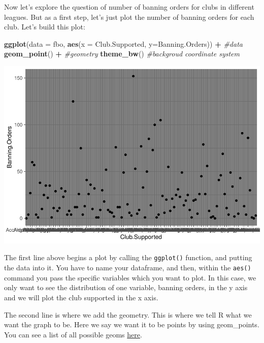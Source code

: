 \documentclass[]{book}
\newenvironment{Shaded}{\begin{snugshade}}{\end{snugshade}}
\newcommand{\CommentTok}[1]{\textcolor[rgb]{0.56,0.35,0.01}{\textit{#1}}}
\newcommand{\DataTypeTok}[1]{\textcolor[rgb]{0.13,0.29,0.53}{#1}}
\newcommand{\KeywordTok}[1]{\textcolor[rgb]{0.13,0.29,0.53}{\textbf{#1}}}
\newcommand{\NormalTok}[1]{#1}
\newcommand{\OperatorTok}[1]{\textcolor[rgb]{0.81,0.36,0.00}{\textbf{#1}}}
\newcommand{\StringTok}[1]{\textcolor[rgb]{0.31,0.60,0.02}{#1}}
\theoremstyle{definition}
\theoremstyle{definition}
\theoremstyle{definition}
\theoremstyle{remark}
\begin{document}
Now let's explore the question of number of banning orders for clubs in
different leagues. But as a first step, let's just plot the number of
banning orders for each club. Let's build this plot:

\begin{Shaded}
\begin{Highlighting}[]
\KeywordTok{ggplot}\NormalTok{(}\DataTypeTok{data =}\NormalTok{ fbo, }\KeywordTok{aes}\NormalTok{(}\DataTypeTok{x =}\NormalTok{ Club.Supported, }\DataTypeTok{y=}\NormalTok{Banning.Orders)) }\OperatorTok{+}\StringTok{          }\CommentTok{#data}
\StringTok{   }\KeywordTok{geom_point}\NormalTok{() }\OperatorTok{+}\StringTok{                           }\CommentTok{#geometry}
\StringTok{  }\KeywordTok{theme_bw}\NormalTok{()                                    }\CommentTok{#backgroud coordinate system}
\end{Highlighting}
\end{Shaded}

\includegraphics{03-visualisation_files/figure-latex/unnamed-chunk-4-1.pdf}

The first line above begins a plot by calling the \texttt{ggplot()}
function, and putting the data into it. You have to name your dataframe,
and then, within the \texttt{aes()} command you pass the specific
variables which you want to plot. In this case, we only want to see the
distribution of one variable, banning orders, in the y axis and we will
plot the club supported in the x axis.

The second line is where we add the geometry. This is where we tell R
what we want the graph to be. Here we say we want it to be points by
using geom\_points. You can see a list of all possible geoms
\href{http://docs.ggplot2.org/current/}{here}.
\end{document}

